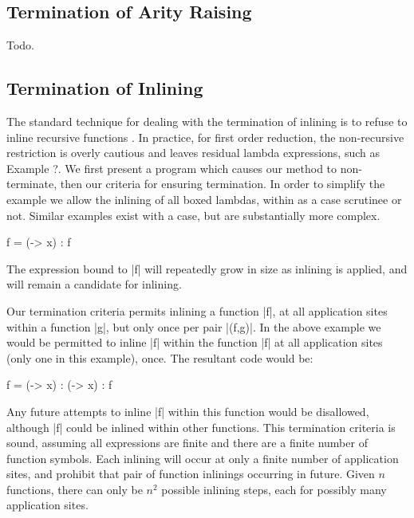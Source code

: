 \documentclass[preprint]{sigplanconf}
\begin{document}
\subsection{Termination of Arity Raising}

Todo.

\subsection{Termination of Inlining}

The standard technique for dealing with the termination of inlining is to refuse to inline recursive functions \cite{spj:inlining}. In practice, for first order reduction, the non-recursive restriction is overly cautious and leaves residual lambda expressions, such as Example ?. We first present a program which causes our method to non-terminate, then our criteria for ensuring termination. In order to simplify the example we allow the inlining of all boxed lambdas, within as a case scrutinee or not. Similar examples exist with a case, but are substantially more complex.

\begin{example}
\begin{code}
f = (\x -> x) : f
\end{code}

The expression bound to |f| will repeatedly grow in size as inlining is applied, and will remain a candidate for inlining.
\end{example}

Our termination criteria permits inlining a function |f|, at all application sites within a function |g|, but only once per pair |(f,g)|. In the above example we would be permitted to inline |f| within the function |f| at all application sites (only one in this example), once. The resultant code would be:

\begin{code}
f = (\x -> x) : (\x -> x) : f
\end{code}

Any future attempts to inline |f| within this function would be disallowed, although |f| could be inlined within other functions. This termination criteria is sound, assuming all expressions are finite and there are a finite number of function symbols. Each inlining will occur at only a finite number of application sites, and prohibit that pair of function inlinings occurring in future. Given $n$ functions, there can only be $n^2$ possible inlining steps, each for possibly many application sites.
\end{document}
